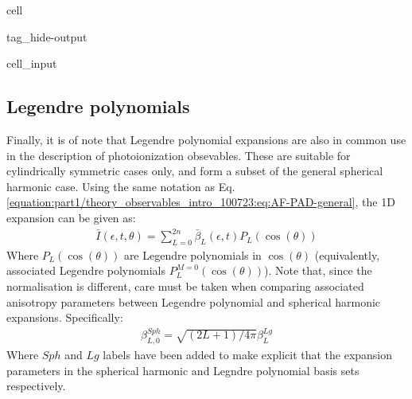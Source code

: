 \documentclass[letterpaper,table,10pt,english]{jupyterBook}
\begin{document}
\begin{sphinxuseclass}{cell}
\begin{sphinxuseclass}{tag_hide-output}\begin{sphinxVerbatimInput}

\begin{sphinxuseclass}{cell_input}
\begin{sphinxVerbatim}[commandchars=\\\{\}]
\PYG{p}{[}\PYG{p}{]}
\end{sphinxVerbatim}

\end{sphinxuseclass}\end{sphinxVerbatimInput}

\end{sphinxuseclass}
\end{sphinxuseclass}

\subsection{Legendre polynomials}
\label{\detokenize{part1/theory_observables_intro_100723:legendre-polynomials}}
\sphinxAtStartPar
Finally, it is of note that Legendre polynomial expansions are also in common use in the description of photoionization obsevables. These are suitable for cylindrically symmetric cases only, and form a subset of the general spherical harmonic case. Using the same notation as Eq. \eqref{equation:part1/theory_observables_intro_100723:eq:AF-PAD-general}, the 1D expansion can be given as:
\begin{equation}\label{equation:part1/theory_observables_intro_100723:eq:AF-PAD-Lg}
\begin{split}
\bar{I}(\epsilon,t,\theta)=\sum_{L=0}^{2n}\bar{\beta}_{L}(\epsilon,t)P_{L}(\cos(\theta))
\end{split}
\end{equation}
\sphinxAtStartPar
Where \(P_{L}(\cos(\theta))\) are Legendre polynomials in \(\cos(\theta)\) (equivalently, associated Legendre polynomials \(P_{L}^{M=0}(\cos(\theta))\)). Note that, since the normalisation is different, care must be taken when comparing associated anisotropy parameters between Legendre polynomial and spherical harmonic expansions. Specifically:
\begin{equation}\label{equation:part1/theory_observables_intro_100723:eq:Lg-Sph-conv}
\begin{split}
\beta^{Sph}_{L,0} = \sqrt{(2L+1)/4\pi}\beta^{Lg}_{L}
\end{split}
\end{equation}
\sphinxAtStartPar
Where \(Sph\) and \(Lg\) labels have been added to make explicit that the expansion parameters in the spherical harmonic and Legndre polynomial basis sets respectively.
\end{document}
